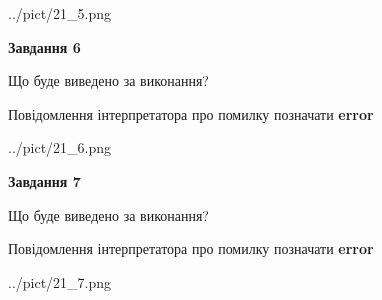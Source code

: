 \documentclass[10pt, ukrainian]{article}
\begin{document}
{\begin {large}
\begin{center}
	{../pict/21_5.png}
\end{center}
\newpage

{\begin {center}\textbf{Завдання 6}\end {center}}\par
Що буде виведено за виконання? \par
Повідомлення інтерпретатора про помилку позначати \textbf{error}

\begin{center}
	{../pict/21_6.png}
\end{center}
\newpage

{\begin {center}\textbf{Завдання 7}\end {center}}\par
Що буде виведено за виконання? \par
Повідомлення інтерпретатора про помилку позначати \textbf{error}

\begin{center}
	{../pict/21_7.png}
\end{center}
\newpage

\end {large}}
\end{document}

